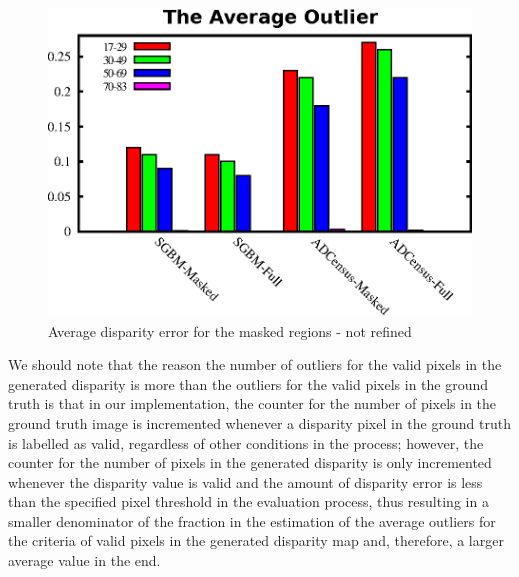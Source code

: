 \begin{figure}[H]
\centering
\includegraphics[scale=0.9]{outlchart}
\caption{Average disparity error for the masked regions - not refined}
\label{fig:outlbar}
\end{figure} 


We should note that the reason the number of outliers for the valid pixels in the generated disparity is more than the outliers for the valid pixels
in the ground truth is that in our implementation, the counter for the number of pixels in the ground truth image 
is incremented whenever a disparity pixel in the ground truth is labelled as valid, regardless of other conditions in the process; 
however, the counter for the number of pixels in the generated disparity
is only incremented whenever the disparity value is valid and the amount of disparity error is less than the specified pixel threshold in the evaluation process, thus resulting
in a smaller denominator of the fraction in the estimation of the average outliers for the criteria of valid pixels in the generated disparity map and, therefore, a larger 
average value in the end.

